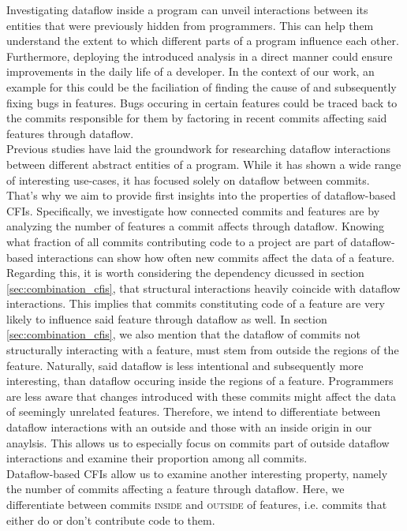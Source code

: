 Investigating dataflow inside a program can unveil interactions between its entities that were previously hidden from programmers.
This can help them understand the extent to which different parts of a program influence each other.
Furthermore, deploying the introduced analysis in a direct manner could ensure improvements in the daily life of a developer.
In the context of our work, an example for this could be the faciliation of finding the cause of and subsequently fixing bugs in features.
Bugs occuring in certain features could be traced back to the commits responsible for them by factoring in recent commits affecting said features through dataflow. \\
Previous studies have laid the groundwork for researching dataflow interactions between different abstract entities of a program.
While it has shown a wide range of interesting use-cases, it has focused solely on dataflow between commits.
That's why we aim to provide first insights into the properties of dataflow-based CFIs.
Specifically, we investigate how connected commits and features are by analyzing the number of features a commit affects through dataflow.
Knowing what fraction of all commits contributing code to a project are part of dataflow-based interactions can show how often new commits affect the data of a feature. 
Regarding this, it is worth considering the dependency dicussed in section \ref{sec:combination_cfis}, that structural interactions heavily coincide with dataflow interactions.
This implies that commits constituting code of a feature are very likely to influence said feature through dataflow as well.
In section \ref{sec:combination_cfis}, we also mention that the dataflow of commits not structurally interacting with a feature, must stem from outside the regions of the feature. 
Naturally, said dataflow is less intentional and subsequently more interesting, than dataflow occuring inside the regions of a feature. 
Programmers are less aware that changes introduced with these commits might affect the data of seemingly unrelated features.
Therefore, we intend to differentiate between dataflow interactions with an outside and those with an inside origin in our anaylsis.
This allows us to especially focus on commits part of outside dataflow interactions and examine their proportion among all commits. \\
Dataflow-based CFIs allow us to examine another interesting property, namely the number of commits affecting a feature through dataflow.
Here, we differentiate between commits \textsc{inside} and \textsc{outside} of features, i.e. commits that either do or don't contribute code to them.
